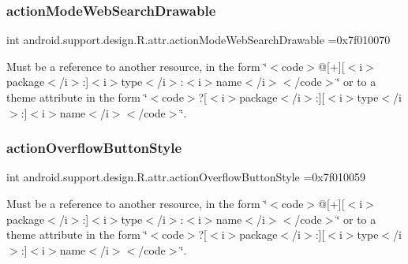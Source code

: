 \subsubsection{\texorpdfstring{action\+Mode\+Web\+Search\+Drawable}{actionModeWebSearchDrawable}}
{\footnotesize\ttfamily int android.\+support.\+design.\+R.\+attr.\+action\+Mode\+Web\+Search\+Drawable =0x7f010070\hspace{0.3cm}{\ttfamily [static]}}

Must be a reference to another resource, in the form \char`\"{}$<$code$>$@\mbox{[}+\mbox{]}\mbox{[}$<$i$>$package$<$/i$>$\+:\mbox{]}$<$i$>$type$<$/i$>$\+:$<$i$>$name$<$/i$>$$<$/code$>$\char`\"{} or to a theme attribute in the form \char`\"{}$<$code$>$?\mbox{[}$<$i$>$package$<$/i$>$\+:\mbox{]}\mbox{[}$<$i$>$type$<$/i$>$\+:\mbox{]}$<$i$>$name$<$/i$>$$<$/code$>$\char`\"{}. \mbox{\label{classandroid_1_1support_1_1design_1_1R_1_1attr_a3334a1bfcd970506bfaebf25b97ddb7c}} 
\subsubsection{\texorpdfstring{action\+Overflow\+Button\+Style}{actionOverflowButtonStyle}}
{\footnotesize\ttfamily int android.\+support.\+design.\+R.\+attr.\+action\+Overflow\+Button\+Style =0x7f010059\hspace{0.3cm}{\ttfamily [static]}}

Must be a reference to another resource, in the form \char`\"{}$<$code$>$@\mbox{[}+\mbox{]}\mbox{[}$<$i$>$package$<$/i$>$\+:\mbox{]}$<$i$>$type$<$/i$>$\+:$<$i$>$name$<$/i$>$$<$/code$>$\char`\"{} or to a theme attribute in the form \char`\"{}$<$code$>$?\mbox{[}$<$i$>$package$<$/i$>$\+:\mbox{]}\mbox{[}$<$i$>$type$<$/i$>$\+:\mbox{]}$<$i$>$name$<$/i$>$$<$/code$>$\char`\"{}. \mbox{\label{classandroid_1_1support_1_1design_1_1R_1_1attr_a58c4106985af115965681fc784e511f3}} 
